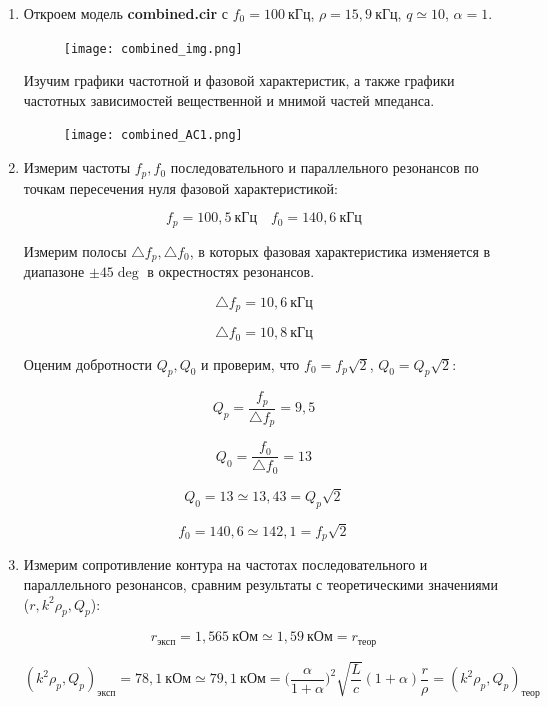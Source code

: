 \documentclass[a4paper, 12pt]{article}%
\begin{document}
\begin{enumerate}

\item Откроем модель \textbf{combined.cir} с $f_0 = 100 \: \textit{кГц}$, $\rho = 15,9 \: \textit{кГц}$, $q \simeq 10$, $\alpha = 1$.

\begin{figure}[h!]
\centering
\texttt{[image: combined\_img.png]}
\label{fig:Image1}
\end{figure}

Изучим графики частотной и фазовой характеристик, а также графики частотных зависимостей вещественной и мнимой частей мпеданса.

\begin{figure}[h!]
\centering
\texttt{[image: combined\_AC1.png]}
\label{fig:Image1}
\end{figure}

\item Измерим частоты $f_p, f_0$ последовательного и параллельного резонансов по точкам пересечения нуля фазовой характеристикой:

\[f_p = 100,5 \: \textit{кГц} \quad f_0 = 140,6 \: \textit{кГц}\]

Измерим полосы $\triangle f_p, \triangle f_0$, в которых фазовая характеристика изменяется в диапазоне $\pm 45 \deg$ в окрестностях резонансов.

\[\triangle f_p = 10,6 \: \textit{кГц}\]

\[\triangle f_0 = 10,8 \: \textit{кГц}\]

Оценим добротности $Q_p, Q_0$ и проверим, что $f_0 = f_p \sqrt{2}$, $Q_0 = Q_p \sqrt{2}$:

\[Q_p = \frac{f_p}{\triangle f_p} = 9,5\]

\[Q_0 = \frac{f_0}{\triangle f_0} = 13\]

\[Q_0 = 13 \simeq 13,43 = Q_p \sqrt{2}\]

\[f_0 = 140,6 \simeq 142,1 = f_p \sqrt{2}\]

\item Измерим сопротивление контура на частотах последовательного и параллельного резонансов, сравним результаты с теоретическими значениями ($r, k^2\rho_p, Q_p$):

\[r_{\textit{эксп}} = 1,565 \: \textit{кОм} \simeq 1,59 \: \textit{кОм} = r_{\textit{теор}}\]

\[(k^2\rho_p, Q_p)_{\textit{эксп}} = 78,1 \: \textit{кОм} \simeq  79,1 \: \textit{кОм} = \Big(\frac{\alpha}{1 + \alpha}\Big)^2 \sqrt{\frac{L}{c}}(1 + \alpha)\frac{r}{\rho} = (k^2\rho_p, Q_p)_{\textit{теор}}\]


\end{enumerate}
\end{document}
